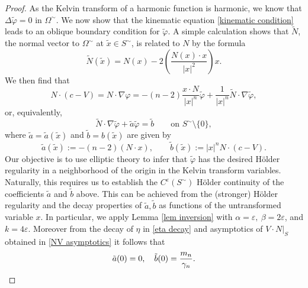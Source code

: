 \documentclass[11pt,reqno]{amsart}
\theoremstyle{plain}
\theoremstyle{remark}
\numberwithin{equation}{section}
\begin{document}
\begin{proof}
As the Kelvin transform of a harmonic function is harmonic, we know that $\Delta \tilde \varphi = 0$ in $\Omega^\sim$.  We now show that the kinematic equation \eqref{kinematic condition} leads to an oblique boundary condition for $\tilde \varphi$.  A simple calculation shows that $\tilde N$, the normal vector to $\Omega^\sim$ at $\tilde x \in S^\sim$, is related to $N$ by the formula 
\[ \tilde N (\tilde x) = N(x) - 2 \left(\frac{N(x) \cdot x}{|x|^2} \right) x.\]
We then find that
\[
N \cdot \left(c - V \right) = N \cdot \nabla \varphi = -(n-2) \frac{x \cdot N}{|x|^n} \tilde \varphi + \frac{1}{|x|^n} \tilde{N} \cdot \nabla \tilde \varphi,
\]
or, equivalently,
\begin{equation}
  \tilde N \cdot \nabla \tilde\varphi + \tilde a \tilde\varphi = \tilde b \qquad \textrm{on } S^\sim \setminus \{0\},
  \label{transform boundary condition}
\end{equation}
where $\tilde a = \tilde a(\tilde x)$ and $\tilde b = b(\tilde x)$ are given by
\begin{equation}
  \tilde a(\tilde x) := -(n-2)\left( N \cdot x \right), \qquad \tilde b(\tilde x) := {|x|^n} N \cdot (c - V). 
  \label{def alpha beta} 
\end{equation}
Our objective is to use elliptic theory to infer that $\tilde \varphi$ has the desired H\"older regularity in a neighborhood of the origin in the Kelvin transform variables.  Naturally, this requires us to establish the $C^{\varepsilon}(S^\sim)$ H\"older continuity of the coefficients $\tilde a$ and $\tilde b$ above. This can be achieved from the (stronger) H\"older regularity and the decay properties of $\tilde a,\tilde b$ as functions of the untransformed variable $x$.  In particular, we apply Lemma \ref{lem inversion} with $\alpha = \varepsilon,\ \beta = 2\varepsilon$, and $k = 4\varepsilon$. Moreover from the decay of $\eta$ in \eqref{eta decay} and asymptotics of $V \cdot N|_S$ obtained in  \eqref{NV asymptotics} it follows that 
\begin{equation*}
\tilde a(0) = 0, \quad \tilde b(0) = {m_n \over \gamma_n}.
\end{equation*}


\end{proof}
\end{document}
